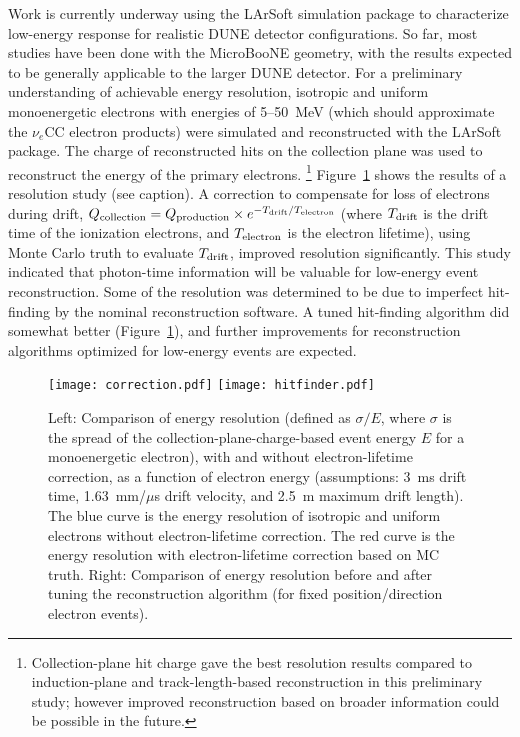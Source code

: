 Work is currently underway using the LArSoft simulation package to
characterize low-energy response for realistic DUNE detector
configurations.
So far, most studies have been done with the MicroBooNE geometry, with
the results expected to be generally applicable to the larger DUNE
detector.  For a preliminary understanding of achievable energy
resolution, isotropic and uniform monoenergetic electrons with
energies of 5--50~MeV (which should approximate the $\nu_e$CC
electron products) were simulated and reconstructed with the LArSoft
package.  The charge of reconstructed hits on the collection plane was
used to reconstruct the energy of the primary electrons.
\footnote{Collection-plane hit charge gave the best resolution results
  compared to induction-plane and track-length-based reconstruction in
  this preliminary study; however improved reconstruction based on
  broader information could be possible in the future.}
Figure~\ref{fig:lowe_res} shows the results of a resolution study (see
caption).  A correction to compensate for loss of electrons during
drift, $Q_{\rm collection}=Q_{\rm production}\times e^{-T_{\rm drift} / T_{\rm
    electron}}$ (where $T_{\rm drift}$ is the drift time of the ionization
electrons, and $T_{\rm electron}$ is the electron lifetime), using Monte
Carlo truth to evaluate $T_{\rm drift}$, improved resolution
significantly.  This study indicated that photon-time information will
be valuable for low-energy event reconstruction.  Some of the
resolution was determined to be due to imperfect hit-finding by the
nominal reconstruction software.  A tuned hit-finding algorithm did
somewhat better (Figure~\ref{fig:lowe_res}), and further improvements
for reconstruction algorithms optimized for low-energy events are
expected.
\begin{figure}[!htb] %
 \centering
\texttt{[image: correction.pdf]} 
\texttt{[image: hitfinder.pdf]} 
 \caption[Comparisons of energy resolution]{Left: Comparison of energy
   resolution (defined as $\sigma/E$, where $\sigma$ is the spread of
   the collection-plane-charge-based event energy $E$ for a
   monoenergetic electron), with and without electron-lifetime
   correction, as a function of electron energy (assumptions: 3~ms drift time, 1.63~mm/$\mu$s drift velocity, and 2.5~m maximum drift length). The blue curve is the
   energy resolution of isotropic and uniform electrons without
   electron-lifetime correction. The red curve is the energy
   resolution with electron-lifetime correction based on MC truth.
   Right: Comparison of energy resolution before and after tuning the
   reconstruction algorithm (for fixed position/direction electron
   events).}\label{fig:lowe_res}
\end{figure}


